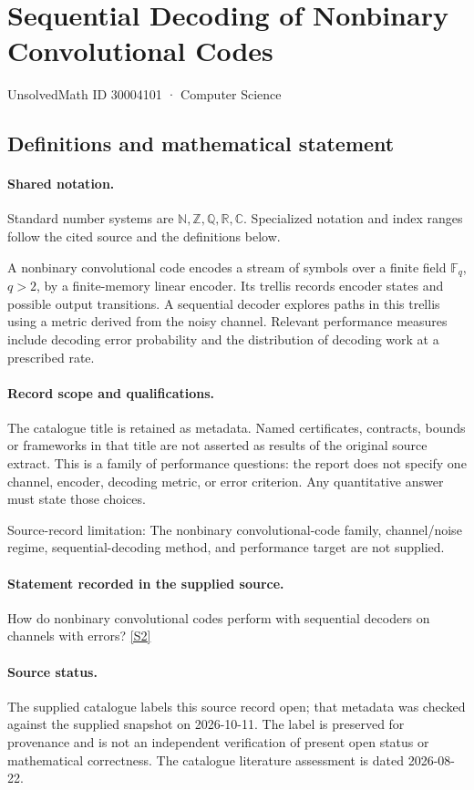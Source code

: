 \documentclass[11pt]{article}
\newcommand{\sref}[2]{\hyperlink{source:#1:#2}{[S#2]}}
\begin{document}
\setcounter{section}{30004100}
\section{Sequential Decoding of Nonbinary Convolutional Codes}\label{30004101}
{\small\sffamily UnsolvedMath ID 30004101 · Computer Science}
\subsection{Definitions and mathematical statement}

\paragraph{Shared notation.}Standard number systems are $\mathbb N,\mathbb Z,\mathbb Q,\mathbb R,\mathbb C$. Specialized notation and index ranges follow the cited source and the definitions below.


A nonbinary convolutional code encodes a stream of symbols over a finite field $\mathbb F_q$, $q>2$, by a finite-memory linear encoder. Its trellis records encoder states and possible output transitions. A sequential decoder explores paths in this trellis using a metric derived from the noisy channel. Relevant performance measures include decoding error probability and the distribution of decoding work at a prescribed rate.
\paragraph{Record scope and qualifications.}
The catalogue title is retained as metadata. Named certificates, contracts, bounds or frameworks in that title are not asserted as results of the original source extract.
This is a family of performance questions: the report does not specify one channel, encoder, decoding metric, or error criterion. Any quantitative answer must state those choices.

Source-record limitation: The nonbinary convolutional-code family, channel/noise regime, sequential-decoding method, and performance target are not supplied.
\paragraph{Statement recorded in the supplied source.}
How do nonbinary convolutional codes perform with sequential decoders on channels with errors? \sref{30004101}{2}
\paragraph{Source status.}
The supplied catalogue labels this source record open; that metadata was checked against the supplied snapshot on 2026-10-11. The label is preserved for provenance and is not an independent verification of present open status or mathematical correctness. The catalogue literature assessment is dated 2026-08-22.
\end{document}
